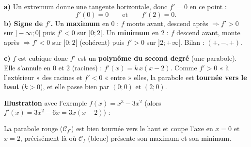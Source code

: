 \documentclass[11pt,a4paper]{article}
\begin{document}
\begin{corr}
\textbf{a)} Un extremum donne une tangente horizontale, donc $f'=0$ en ce point :
\[
f'(0)=0\qquad\text{et}\qquad f'(2)=0.
\]
\textbf{b) Signe de $f'$.} Un \textbf{maximum} en $0$ : $f$ monte avant, descend après $\Rightarrow f'>0$ sur $]-\infty;0[$ puis $f'<0$ sur $]0;2[$. Un \textbf{minimum} en $2$ : $f$ descend avant, monte après $\Rightarrow f'<0$ sur $]0;2[$ (cohérent) puis $f'>0$ sur $]2;+\infty[$. Bilan : $(+,-,+)$.

\smallskip
\textbf{c)} $f$ est cubique donc $f'$ est un \textbf{polynôme du second degré} (une parabole). Elle s'annule en $0$ et $2$ (racines) : $f'(x)=k\,x(x-2)$. Comme $f'>0$ « à l'extérieur » des racines et $f'<0$ « entre » elles, la parabole est \textbf{tournée vers le haut} ($k>0$), et elle passe bien par $(0;0)$ et $(2;0)$.

\smallskip
\textbf{Illustration} avec l'exemple $f(x)=x^3-3x^2$ (alors $f'(x)=3x^2-6x=3x(x-2)$) :
\begin{center}
\end{center}
La parabole rouge ($\mathcal{C}_{f'}$) est bien tournée vers le haut et coupe l'axe en $x=0$ et $x=2$, précisément là où $\mathcal{C}_f$ (bleue) présente son maximum et son minimum.
\end{corr}
\end{document}
